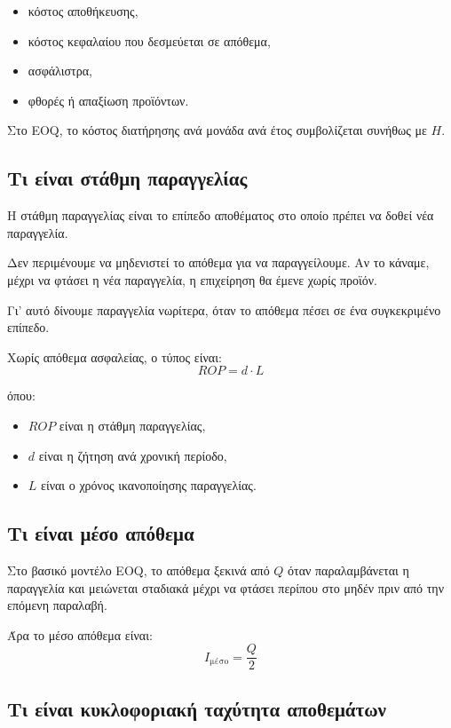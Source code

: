 \documentclass[12pt,a4paper]{article}
\begin{document}
\begin{itemize}
    \item κόστος αποθήκευσης,
    \item κόστος κεφαλαίου που δεσμεύεται σε απόθεμα,
    \item ασφάλιστρα,
    \item φθορές ή απαξίωση προϊόντων.
\end{itemize}

Στο EOQ, το κόστος διατήρησης ανά μονάδα ανά έτος συμβολίζεται συνήθως με \(H\).

\subsection{Τι είναι στάθμη παραγγελίας}

Η στάθμη παραγγελίας είναι το επίπεδο αποθέματος στο οποίο πρέπει να δοθεί νέα παραγγελία.

Δεν περιμένουμε να μηδενιστεί το απόθεμα για να παραγγείλουμε. Αν το κάναμε, μέχρι να φτάσει η νέα παραγγελία, η επιχείρηση θα έμενε χωρίς προϊόν.

Γι' αυτό δίνουμε παραγγελία νωρίτερα, όταν το απόθεμα πέσει σε ένα συγκεκριμένο επίπεδο.

Χωρίς απόθεμα ασφαλείας, ο τύπος είναι:
\[
ROP=d\cdot L
\]

όπου:

\begin{itemize}
    \item \(ROP\) είναι η στάθμη παραγγελίας,
    \item \(d\) είναι η ζήτηση ανά χρονική περίοδο,
    \item \(L\) είναι ο χρόνος ικανοποίησης παραγγελίας.
\end{itemize}

\subsection{Τι είναι μέσο απόθεμα}

Στο βασικό μοντέλο EOQ, το απόθεμα ξεκινά από \(Q\) όταν παραλαμβάνεται η παραγγελία και μειώνεται σταδιακά μέχρι να φτάσει περίπου στο μηδέν πριν από την επόμενη παραλαβή.

Άρα το μέσο απόθεμα είναι:
\[
I_{\text{μέσο}}=\frac{Q}{2}
\]

\subsection{Τι είναι κυκλοφοριακή ταχύτητα αποθεμάτων}
\end{document}
